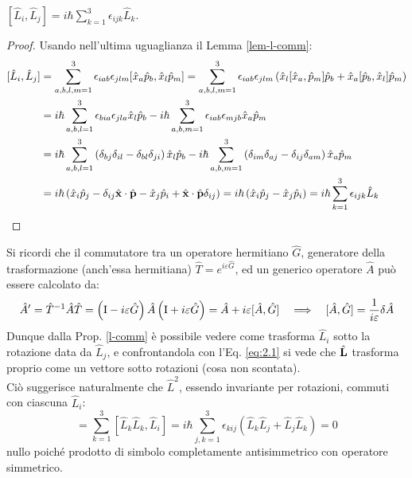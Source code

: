 \begin{proposition}\label{l-comm}
	$ [\hat{L}_i,\hat{L}_j] = i\hbar \sum_{k = 1}^{3} \epsilon_{ijk} \hat{L}_k $.
\end{proposition}
\begin{proof}
	Usando nell'ultima uguaglianza il Lemma \ref{lem-l-comm}:
	\begin{equation*}
		\begin{split}
			[\hat{L}_i,\hat{L}_j]
			&= \sum_{a,b,l,m = 1}^{3} \epsilon_{iab}\epsilon_{jlm} [\hat{x}_a \hat{p}_b,\hat{x}_l \hat{p}_m] = \sum_{a,b,l,m = 1}^{3}  \epsilon_{iab} \epsilon_{jlm} \left( \hat{x}_l [\hat{x}_a,\hat{p}_m] \hat{p}_b + \hat{x}_a [\hat{p}_b,\hat{x}_l] \hat{p}_m \right)\\
			&= i\hbar \sum_{a,b,l = 1}^{3} \epsilon_{bia} \epsilon_{jla} \hat{x}_l \hat{p}_b - i\hbar \sum_{a,b,m = 1}^{3} \epsilon_{iab} \epsilon_{mjb} \hat{x}_a \hat{p}_m\\
			&= i\hbar \sum_{a,b,l = 1}^{3} \left( \delta_{bj}\delta_{il} - \delta_{bl}\delta_{ji} \right) \hat{x}_l \hat{p}_b - i\hbar \sum_{a,b,m = 1}^{3} \left( \delta_{im} \delta_{aj} - \delta_{ij}\delta_{am} \right) \hat{x}_a \hat{p}_m\\
			&= i\hbar \left( \hat{x}_i \hat{p}_j - \delta_{ij} \hat{\mathbf{x}}\cdot\hat{\mathbf{p}} - \hat{x}_j \hat{p}_i + \hat{\mathbf{x}}\cdot\hat{\mathbf{p}} \delta_{ij} \right) = i\hbar \left( \hat{x}_i \hat{p}_j - \hat{x}_j \hat{p}_i \right) = i\hbar \sum_{k = 1}^{3} \epsilon_{ijk} \hat{L}_k
		\end{split}
	\end{equation*}
\end{proof}

Si ricordi che il commutatore tra un operatore hermitiano $ \hat{G} $, generatore della trasformazione (anch'essa hermitiana) $ \hat{T} = e^{i \varepsilon \hat{G}} $, ed un generico operatore $ \hat{A} $ può essere calcolato da:
\begin{equation}
	\hat{A}' = \hat{T}^{-1} \hat{A} \hat{T} = \left( \mathbf{\text{I}} - i\varepsilon\hat{G} \right) \hat{A} \left( \mathbf{\text{I}} + i\varepsilon\hat{G} \right) = \hat{A} + i\varepsilon [\hat{A},\hat{G}] \quad\Longrightarrow\quad [\hat{A},\hat{G}] = \frac{1}{i\varepsilon} \delta\hat{A}
	\label{eq:2.11}
\end{equation}
Dunque dalla Prop. \ref{l-comm} è possibile vedere come trasforma $ \hat{L}_i $ sotto la rotazione data da $ \hat{L}_j $, e confrontandola con l'Eq. \ref{eq:2.1} si vede che $ \hat{\mathbf{L}} $ trasforma proprio come un vettore sotto rotazioni (cosa non scontata).\\
Ciò suggerisce naturalmente che $ \hat{L}^2 $, essendo invariante per rotazioni, commuti con ciascuna $ \hat{L}_i $:
\begin{equation}
	[\hat{L}^2,\hat{L}_i] = \sum_{k = 1}^{3} [\hat{L}_k\hat{L}_k,\hat{L}_i] = i\hbar \sum_{j,k = 1}^{3} \epsilon_{kij} \left( \hat{L}_k\hat{L}_j + \hat{L}_j\hat{L}_k \right) = 0
	\label{eq:2.12}
\end{equation}
nullo poiché prodotto di simbolo completamente antisimmetrico con operatore simmetrico.

